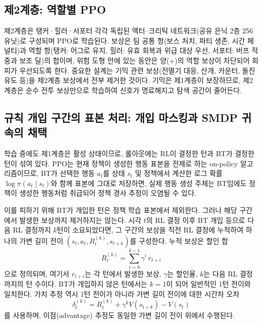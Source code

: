 \documentclass[12pt]{article}      %
\begin{document}
\subsection{제2계층: 역할별 PPO}

제2계층은 탱커·힐러·서포터 각각 독립된 액터--크리틱 네트워크(공유 은닉 2층
256유닛)로 구성되며 PPO로 학습된다. 보상은 팀 공통 항(보스 처치, 파티 생존,
시간 페널티)과 역할 항(탱커: 어그로 유지, 힐러: 유효 회복과 위급 대상 우선,
서포터: 버프 적중과 보조 딜)의 합이며, 위험 도형 안에 있는 동안은 양(+)의 역할
보상이 차단되어 회피가 우선되도록 한다. 중요한 설계는 기믹 관련 보상(전멸기 대응,
산개, 카운터, 돌진 유도 등)을 제2계층 보상에서 전부 제거한 것이다. 기믹은
제1계층이 보장하므로, 제2계층은 순수 전투 보상만으로 학습하여 신호가 명료해지고
탐색 공간이 줄어든다.

\subsection{규칙 개입 구간의 표본 처리: 개입 마스킹과 SMDP 귀속의 채택}
\label{sec:sampling}

학습 중에도 제1계층은 활성 상태이므로, 롤아웃에는 RL이 결정한 턴과 BT가 결정한
턴이 섞여 있다. PPO는 현재 정책이 생성한 행동 표본을 전제로 하는 on-policy
알고리즘이므로, BT가 선택한 행동 $a_t$를 상태 $s_t$ 및 정책에서 계산한 로그 확률
$\log \pi(a_t \mid s_t)$와 함께 표본에 그대로 저장하면, 실제 행동 생성 주체는
BT임에도 정책이 생성한 행동처럼 취급되어 정책 경사 추정이 오염될 수 있다.

이를 피하기 위해 BT가 개입한 턴은 정책 학습 표본에서 제외한다. 그러나 해당
구간에서 발생한 보상까지 제거하지는 않는다. 시각 $t$의 RL 결정 이후 BT 개입
등으로 다음 RL 결정까지 $k$턴이 소요되었다면, 그 구간의 보상을 직전 RL 결정에
누적하여 하나의 가변 길이 전이 $(s_t, a_t, R_t^{(k)}, s_{t+k})$를 구성한다. 누적
보상은 할인 합
\begin{equation}
R_t^{(k)} = \sum_{i=0}^{k-1} \gamma^{i}\, r_{t+i}
\label{eq:smdp-return}
\end{equation}
으로 정의되며, 여기서 $r_{t+i}$는 각 턴에서 발생한 보상, $\gamma$는 할인율,
$k$는 다음 RL 결정까지의 턴 수이다. BT가 개입하지 않은 턴에서는 $k=1$이 되어
일반적인 1턴 전이와 일치한다. 가치 추정 역시 1턴 전이가 아니라 가변 길이 전이에
대한 시간차 오차
\begin{equation}
\delta_t^{(k)} = R_t^{(k)} + \gamma^{k} V(s_{t+k}) - V(s_t)
\label{eq:smdp-delta}
\end{equation}
를 사용하며, 이점(advantage) 추정도 동일한 가변 길이 전이 위에서 수행된다.
\end{document}
